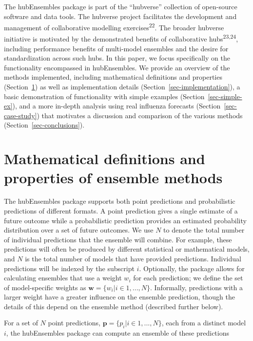 \documentclass[
  letterpaper,
  DIV=11,
  numbers=noendperiod]{scrartcl}
\begin{document}
The {hubEnsembles} package is part of the ``hubverse'' collection of
open-source software and data tools. The hubverse project facilitates
the development and management of collaborative modelling
exercises\textsuperscript{22}. The broader hubverse initiative is
motivated by the demonstrated benefits of collaborative
hubs\textsuperscript{23,24}, including performance benefits of
multi-model ensembles and the desire for standardization across such
hubs. In this paper, we focus specifically on the functionality
encompassed in {hubEnsembles}. We provide an overview of the methods
implemented, including mathematical definitions and properties
(Section~\ref{sec-defs}) as well as implementation details
(Section~\ref{sec-implementation}), a basic demonstration of
functionality with simple examples (Section~\ref{sec-simple-ex}), and a
more in-depth analysis using real influenza forecasts
(Section~\ref{sec-case-study}) that motivates a discussion and
comparison of the various methods (Section~\ref{sec-conclusions}).

\section{Mathematical definitions and properties of ensemble
methods}\label{sec-defs}

The {hubEnsembles} package supports both point predictions and
probabilistic predictions of different formats. A point prediction gives
a single estimate of a future outcome while a probabilistic prediction
provides an estimated probability distribution over a set of future
outcomes. We use \(N\) to denote the total number of individual
predictions that the ensemble will combine. For example, these
predictions will often be produced by different statistical or
mathematical models, and \(N\) is the total number of models that have
provided predictions. Individual predictions will be indexed by the
subscript \(i\). Optionally, the package allows for calculating
ensembles that use a weight \(w_i\) for each prediction; we define the
set of model-specific weights as
\(\pmb{w} = \{w_i | i \in 1, ..., N\}\). Informally, predictions with a
larger weight have a greater influence on the ensemble prediction,
though the details of this depend on the ensemble method (described
further below).

For a set of \(N\) point predictions,
\(\pmb{p} = \{p_i|i \in 1, ..., N\}\), each from a distinct model \(i\),
the {hubEnsembles} package can compute an ensemble of these predictions
\end{document}
